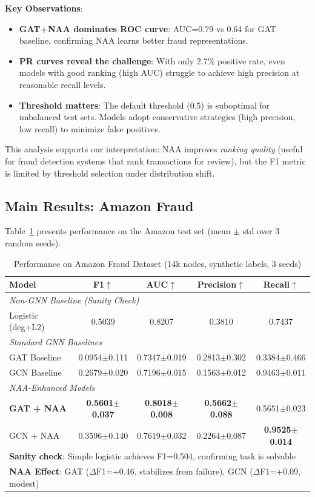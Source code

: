 \textbf{Key Observations}:
\begin{itemize}
\item \textbf{GAT+NAA dominates ROC curve}: AUC=0.79 vs 0.64 for GAT baseline, confirming NAA learns better fraud representations.
\item \textbf{PR curves reveal the challenge}: With only 2.7\% positive rate, even models with good ranking (high AUC) struggle to achieve high precision at reasonable recall levels.
\item \textbf{Threshold matters}: The default threshold (0.5) is suboptimal for imbalanced test sets. Models adopt conservative strategies (high precision, low recall) to minimize false positives.
\end{itemize}

This analysis supports our interpretation: NAA improves \textit{ranking quality} (useful for fraud detection systems that rank transactions for review), but the F1 metric is limited by threshold selection under distribution shift.

\subsection{Main Results: Amazon Fraud}

Table~\ref{tab:amazon_main} presents performance on the Amazon test set (mean $\pm$ std over 3 random seeds).

\begin{table}[t]
\centering
\caption{Performance on Amazon Fraud Dataset (14k nodes, synthetic labels, 3 seeds)}
\label{tab:amazon_main}
\small
\begin{tabular}{lcccc}
\toprule
\textbf{Model} & \textbf{F1}$\uparrow$ & \textbf{AUC}$\uparrow$ & \textbf{Precision}$\uparrow$ & \textbf{Recall}$\uparrow$ \\
\midrule
\multicolumn{5}{l}{\textit{Non-GNN Baseline (Sanity Check)}} \\
Logistic (deg+L2) & 0.5039 & 0.8207 & 0.3810 & 0.7437 \\
\midrule
\multicolumn{5}{l}{\textit{Standard GNN Baselines}} \\
GAT Baseline & 0.0954$\pm$0.111 & 0.7347$\pm$0.019 & 0.2813$\pm$0.302 & 0.3384$\pm$0.466 \\
GCN Baseline & 0.2679$\pm$0.020 & 0.7196$\pm$0.015 & 0.1563$\pm$0.012 & 0.9463$\pm$0.011 \\
\midrule
\multicolumn{5}{l}{\textit{NAA-Enhanced Models}} \\
\textbf{GAT + NAA} & \textbf{0.5601$\pm$0.037} & \textbf{0.8018$\pm$0.008} & \textbf{0.5662$\pm$0.088} & 0.5651$\pm$0.023 \\
GCN + NAA & 0.3596$\pm$0.140 & 0.7619$\pm$0.032 & 0.2264$\pm$0.087 & \textbf{0.9525$\pm$0.014} \\
\bottomrule
\multicolumn{5}{l}{\footnotesize \textbf{Sanity check}: Simple logistic achieves F1=0.504, confirming task is solvable} \\
\multicolumn{5}{l}{\footnotesize \textbf{NAA Effect}: GAT ($\Delta$F1=+0.46, stabilizes from failure), GCN ($\Delta$F1=+0.09, modest)} \\
\end{tabular}
\end{table}

